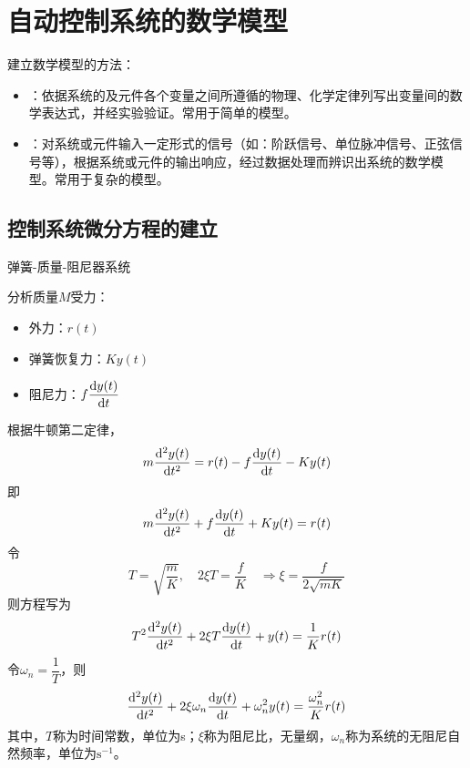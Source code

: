 \chapter{自动控制系统的数学模型}
\thispagestyle{empty}
\noindent 建立数学模型的方法：
\begin{itemize}
	\item {}：依据系统的及元件各个变量之间所遵循的物理、化学定律列写出变量间的数学表达式，并经实验验证。常用于简单的模型。
	\item {}：对系统或元件输入一定形式的信号（如：阶跃信号、单位脉冲信号、正弦信号等），根据系统或元件的输出响应，经过数据处理而辨识出系统的数学模型。常用于复杂的模型。
\end{itemize}

\section{控制系统微分方程的建立}

\examples 弹簧-质量-阻尼器系统

\solve 分析质量$M$受力：
\begin{itemize}
	\item 外力：$r(t)$
	\item 弹簧恢复力：$Ky(t)$
	\item 阻尼力：$f \dfrac{{\rm{d}} y(t)}{{\rm{d}} t}$
\end{itemize}
根据牛顿第二定律，
\begin{equation*}
	m \frac{{\rm{d}}^2 y(t)}{{\rm{d}} t^2}=r(t)-f\frac{{\rm{d}} y(t)}{{\rm{d}} t}-K y(t)
\end{equation*}
即
\begin{equation}
	m \frac{{\rm{d}}^2 y(t)}{{\rm{d}} t^2} + f\frac{{\rm{d}} y(t)}{{\rm{d}} t} + K y(t) = r(t)
\end{equation}
令
\begin{equation*}
	T = \sqrt{\dfrac{m}{K}}, \quad 2\xi T = \frac fK \quad \Longrightarrow \xi = \frac{f}{2\sqrt{mK}}
\end{equation*}
则方程写为
\begin{equation*}
	T^2 \frac{{\rm{d}}^2 y(t)}{{\rm{d}} t^2} + 2\xi T\frac{{\rm{d}} y(t)}{{\rm{d}} t} + y(t) = \frac 1K r(t)
\end{equation*}
令$\omega_n=\dfrac 1 T$，则
\begin{equation}
	 \frac{{\rm{d}}^2 y(t)}{{\rm{d}} t^2} + 2\xi \omega_n\frac{{\rm{d}} y(t)}{{\rm{d}} t} + \omega_n^2y(t) = \frac {\omega_n^2}{K} r(t)
\end{equation}
其中，$T$称为时间常数，单位为s；$\xi$称为阻尼比，无量纲，$\omega_n$称为系统的无阻尼自然频率，单位为$\text{s}^{-1}$。

